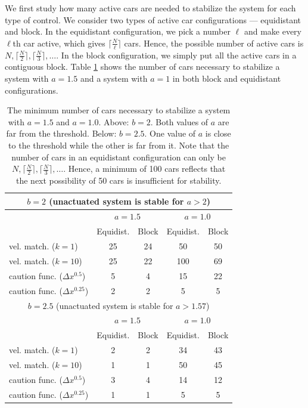 \documentclass[10pt,twocolumn]{article}
\theoremstyle{ss}
\begin{document}
We first study how many active cars are needed to stabilize the system for each type of control. We consider two types of active car configurations --- equidistant and block. In the equidistant configuration, we pick a number $\ell$ and make every $\ell$th car active, which gives $\lceil \frac{N}{\ell} \rceil$ cars. Hence, the possible number of active cars is $N, \lceil \frac{N}{2} \rceil, \lceil \frac{N}{3} \rceil, \dots$. In the block configuration, we simply put all the active cars in a contiguous block. Table \ref{tbl:stbl} shows the number of cars necessary to stabilize a system with $a=1.5$ and a system with $a=1$ in both block and equidistant configurations.

\begin{table}[h!]
\footnotesize
\begin{center}
\begin{tabular}{|l|cc|cc|}
\multicolumn{5}{c}{$b=2$ (unactuated system is stable for $a > 2$)}\\\hline
& \multicolumn{2}{c}{$a=1.5$} & \multicolumn{2}{c}{$a=1.0$}\\\hline
& Equidist. & Block & Equidist. & Block\\\hline
vel. match. ($k=1$) & 25 & 24 & 50 & 50\\
vel. match. ($k=10$) & 25 & 22 & 100 & 69\\
caution func. ($\Delta x^{0.5}$) & 5 & 4 & 15 & 22\\
caution func. ($\Delta x^{0.25}$) & 2 & 2 & 5 & 5\\
\hline
\multicolumn{5}{c}{$b=2.5$ (unactuated system is stable for $a > 1.57$)}\\\hline
& \multicolumn{2}{c}{$a=1.5$} & \multicolumn{2}{c}{$a=1.0$}\\\hline
& Equidist. & Block & Equidist. & Block\\\hline
vel. match. ($k=1$) & 2 & 2 & 34 & 43\\
vel. match. ($k=10$) & 1 & 1 & 50 & 45\\
caution func. ($\Delta x^{0.5}$) & 3 & 4 & 14 & 12\\
caution func. ($\Delta x^{0.25}$) & 1 & 1 & 5 & 5\\
\hline
\end{tabular}
\end{center}
\caption{\label{tbl:stbl} The minimum number of cars necessary to stabilize a system with $a=1.5$ and $a=1.0$. Above: $b=2$. Both values of $a$ are far from the threshold. Below: $b=2.5$. One value of $a$ is close to the threshold while the other is far from it. Note that the number of cars in an equidistant configuration can only be $N, \lceil \frac{N}{2} \rceil, \lceil \frac{N}{3} \rceil, \dots$. Hence, a minimum of 100 cars reflects that the next possibility of 50 cars is insufficient for stability.}
\end{table}
\end{document}
